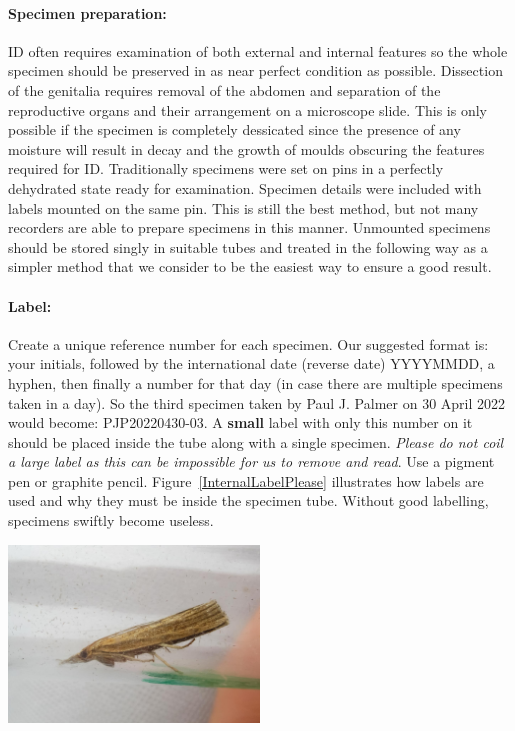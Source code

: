 \documentclass[12pt]{article}
\begin{document}
	\paragraph{Specimen preparation:} ID often requires examination of both external and internal features so the whole specimen should be preserved in as near perfect condition as possible. Dissection of the genitalia requires removal of the abdomen and separation of the reproductive organs and their arrangement on a microscope slide. This is only possible if the specimen is completely dessicated since the presence of any moisture will result in decay and the growth of moulds obscuring the features required for ID. Traditionally specimens were set on pins in a perfectly dehydrated state ready for examination. Specimen details were included  with labels mounted on the same pin. This is still the best method, but not many recorders are able to prepare specimens in this manner. Unmounted specimens should be stored singly in suitable tubes and treated in the following way as a simpler method that we consider to be the easiest way to ensure a good result. 
	

	
	

	\paragraph{Label:} Create a unique reference number for each specimen. Our suggested format is: your initials, followed by the international date (reverse date) YYYYMMDD, a hyphen, then finally a number for that day (in case there are multiple specimens taken in a day). So the third specimen taken by Paul J. Palmer on 30 April 2022 would become: PJP20220430-03. A \textbf{small} label with only this number on it should be placed inside the tube along with a single specimen. \textit{Please do not coil a large label as this can be impossible for us to remove and read}.
	Use a pigment pen or graphite pencil.  Figure~\ref{InternalLabelPlease} illustrates how labels are used and why they must be inside the specimen tube. Without good labelling, specimens swiftly become useless. 

	
			\begin{center}
		\centering
		\includegraphics[width=0.5\textwidth]{images/contaminella}\hfill
		\label{TakePhotgraphs}
	\end{center}
\end{document}
